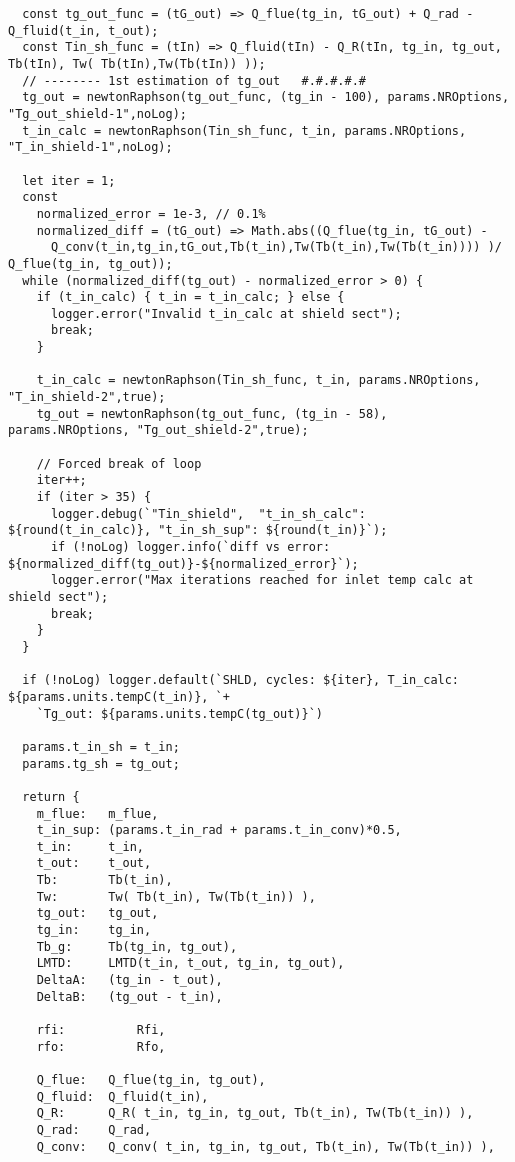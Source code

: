 \begin{verbatim}
  const tg_out_func = (tG_out) => Q_flue(tg_in, tG_out) + Q_rad - Q_fluid(t_in, t_out);
  const Tin_sh_func = (tIn) => Q_fluid(tIn) - Q_R(tIn, tg_in, tg_out, Tb(tIn), Tw( Tb(tIn),Tw(Tb(tIn)) ));
  // -------- 1st estimation of tg_out   #.#.#.#.#
  tg_out = newtonRaphson(tg_out_func, (tg_in - 100), params.NROptions, "Tg_out_shield-1",noLog);
  t_in_calc = newtonRaphson(Tin_sh_func, t_in, params.NROptions, "T_in_shield-1",noLog);

  let iter = 1;
  const 
    normalized_error = 1e-3, // 0.1%
    normalized_diff = (tG_out) => Math.abs((Q_flue(tg_in, tG_out) -
      Q_conv(t_in,tg_in,tG_out,Tb(t_in),Tw(Tb(t_in),Tw(Tb(t_in)))) )/ Q_flue(tg_in, tg_out));
  while (normalized_diff(tg_out) - normalized_error > 0) {
    if (t_in_calc) { t_in = t_in_calc; } else {
      logger.error("Invalid t_in_calc at shield sect");
      break;
    }
    
    t_in_calc = newtonRaphson(Tin_sh_func, t_in, params.NROptions, "T_in_shield-2",true);
    tg_out = newtonRaphson(tg_out_func, (tg_in - 58), params.NROptions, "Tg_out_shield-2",true);

    // Forced break of loop
    iter++;
    if (iter > 35) {
      logger.debug(`"Tin_shield",  "t_in_sh_calc": ${round(t_in_calc)}, "t_in_sh_sup": ${round(t_in)}`);
      if (!noLog) logger.info(`diff vs error: ${normalized_diff(tg_out)}-${normalized_error}`);
      logger.error("Max iterations reached for inlet temp calc at shield sect");
      break;
    }
  }
  
  if (!noLog) logger.default(`SHLD, cycles: ${iter}, T_in_calc: ${params.units.tempC(t_in)}, `+
    `Tg_out: ${params.units.tempC(tg_out)}`)

  params.t_in_sh = t_in;
  params.tg_sh = tg_out;

  return {
    m_flue:   m_flue,
    t_in_sup: (params.t_in_rad + params.t_in_conv)*0.5,
    t_in:     t_in,
    t_out:    t_out,
    Tb:       Tb(t_in),
    Tw:       Tw( Tb(t_in), Tw(Tb(t_in)) ),
    tg_out:   tg_out,
    tg_in:    tg_in,
    Tb_g:     Tb(tg_in, tg_out),
    LMTD:     LMTD(t_in, t_out, tg_in, tg_out),
    DeltaA:   (tg_in - t_out),
    DeltaB:   (tg_out - t_in),

    rfi:          Rfi,
    rfo:          Rfo,

    Q_flue:   Q_flue(tg_in, tg_out),
    Q_fluid:  Q_fluid(t_in),
    Q_R:      Q_R( t_in, tg_in, tg_out, Tb(t_in), Tw(Tb(t_in)) ),
    Q_rad:    Q_rad,
    Q_conv:   Q_conv( t_in, tg_in, tg_out, Tb(t_in), Tw(Tb(t_in)) ),


\end{verbatim}
